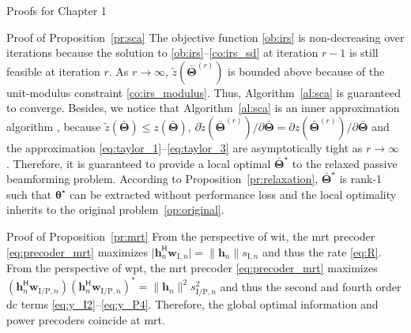 \begin{section}{Proofs for Chapter 1}
	\begin{subsection}{Proof of Proposition~\ref{pr:sca}}\label{ap:sca}
		The objective function \eqref{ob:irs} is non-decreasing over iterations because the solution to \eqref{ob:irs}--\eqref{co:irs_sd} at iteration $r{-}1$ is still feasible at iteration $r$. As $r \to \infty$, $\tilde{z}(\bar{\mathbf{\Theta}}^{(r)})$ is bounded above because of the unit-modulus constraint \eqref{co:irs_modulus}. Thus, Algorithm~\ref{al:sca} is guaranteed to converge. Besides, we notice that Algorithm~\ref{al:sca} is an inner approximation algorithm \cite{Marks1978a}, because $\tilde{z}(\bar{\mathbf{\Theta}}) \le z(\bar{\mathbf{\Theta}})$, $\partial\tilde{z}(\bar{\mathbf{\Theta}}^{(r)})/\partial\bar{\mathbf{\Theta}}=\partial z(\bar{\mathbf{\Theta}}^{(r)})/\partial\bar{\mathbf{\Theta}}$ and the approximation \eqref{eq:taylor_1}--\eqref{eq:taylor_3} are asymptotically tight as $r \to \infty$ \cite{Li2013}. Therefore, it is guaranteed to provide a local optimal $\bar{\mathbf{\Theta}}^{\star}$ to the relaxed passive beamforming problem. According to Proposition~\ref{pr:relaxation}, $\bar{\mathbf{\Theta}}^{\star}$ is rank-\num{1} such that $\boldsymbol{\theta}^{\star}$ can be extracted without performance loss and the local optimality inherits to the original problem~\eqref{op:original}.
	\end{subsection}

	\begin{subsection}{Proof of Proposition~\ref{pr:mrt}}\label{ap:mrt}
		From the perspective of \gls{wit}, the \gls{mrt} precoder \eqref{eq:precoder_mrt} maximizes $\lvert{\mathbf{h}_{n}^\mathsf{H} \mathbf{w}_{\mathrm{I}, n}}\rvert = \lVert{\mathbf{h}_{n}}\rVert s_{\mathrm{I}, n}$ and thus the rate \eqref{eq:R}. From the perspective of \gls{wpt}, the \gls{mrt} precoder \eqref{eq:precoder_mrt} maximizes $(\mathbf{h}_{n}^\mathsf{H} \mathbf{w}_{\mathrm{I/P}, n})(\mathbf{h}_{n}^\mathsf{H} \mathbf{w}_{\mathrm{I/P}, n})^* = \lVert{\mathbf{h}_{n}}\rVert^2 s_{\mathrm{I/P}, n}^2$ and thus the second and fourth order \gls{dc} terms \eqref{eq:y_I2}--\eqref{eq:y_P4}. Therefore, the global optimal information and power precoders coincide at \gls{mrt}.
	\end{subsection}
\end{section}


